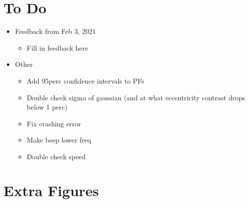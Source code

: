 \documentclass[11pt]{article} %
\begin{document}
\section{To Do} 
\begin{itemize}
\item Feedback from Feb 3, 2021
	\begin{itemize}
	\item Fill in feedback here
	\end{itemize}
\item Other
	\begin{itemize}
	\item Add 95perc confidence intervals to PFs
	\item Double check sigma of gaussian (and at what eccentricity contrast drops below 1 perc)
	\item Fix crashing error
	\item Make beep lower freq
	\item Double check speed
	\end{itemize}
\end{itemize}

\section{Extra Figures}
\end{document}

